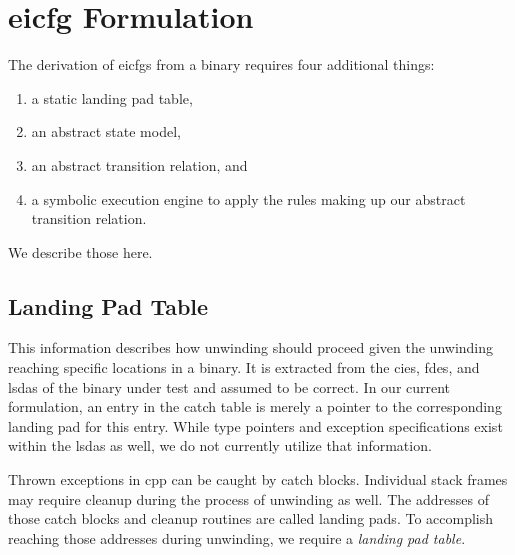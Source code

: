 \chapter{\Acs*{eicfg} Formulation}\label{ch:eicfg-formulation}

The derivation of \acp{eicfg} from a binary requires four additional things:
\begin{enumerate}
    \item a static landing pad table,
    \item an abstract state model,
    \item an abstract transition relation, and
    \item a symbolic execution engine to apply the rules making up our abstract transition relation.
\end{enumerate}
We describe those here.

\section{Landing Pad Table}\label{sec:landing-pad-table}
This information describes how unwinding should proceed given the unwinding reaching specific locations in a binary.
It is extracted from the \acp{cie}, \acp{fde}, and \acp{lsda} of the binary under test and assumed to be correct.
In our current formulation, an entry in the catch table is merely a pointer to the corresponding landing pad for this entry.
While type pointers and exception specifications exist within the \acp{lsda} as well, we do not currently utilize that information.


Thrown exceptions in \gls{cpp} can be caught by catch blocks.
Individual stack frames may require cleanup during the process of unwinding as well.
The addresses of those catch blocks and cleanup routines are called landing pads.
To accomplish reaching those addresses during unwinding, we require a \emph{landing pad table}.

